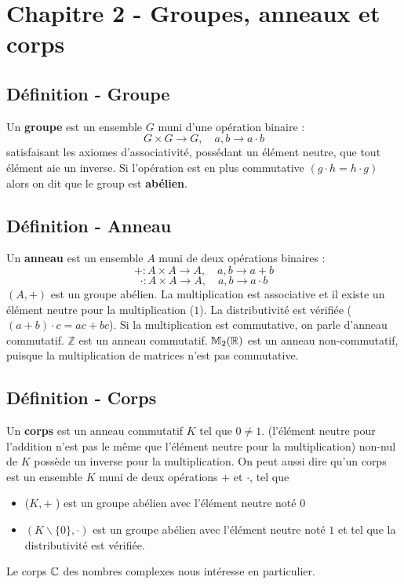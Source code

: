 \documentclass[12pt]{article}
\begin{document}
\section{Chapitre 2 - Groupes, anneaux et corps}
\subsection{Définition - Groupe}
Un \textbf{groupe} est un ensemble $G$ muni d'une opération binaire :
$$
G \times G \rightarrow G, \quad a,b \rightarrow a \cdot b
$$
satisfaisant les axiomes d'associativité, possédant un élément neutre, que tout élément aie un inverse. 
Si l'opération est en plus commutative $(g \cdot h = h \cdot g)$ alors on dit que le group est \textbf{abélien}.
\pagebreak
\subsection{Définition - Anneau}
Un \textbf{anneau} est un ensemble $A$ muni de deux opérations binaires :
$$
+ : A \times A \rightarrow A, \quad a,b \rightarrow a + b
$$
$$\cdot : A \times A \rightarrow A, \quad a,b \rightarrow a\cdot b$$
$(A, +)$ est un groupe abélien. 
La multiplication est associative et il existe un élément neutre pour la multiplication ($1$). 
La distributivité est vérifiée ($(a+b)\cdot c = ac + bc$).
Si la multiplication est commutative, on parle d'anneau commutatif. $\mathbb Z$ est un anneau commutatif. $\mathbb M_2(\mathbb{R})$ est un anneau non-commutatif, puisque la multiplication de matrices n'est pas commutative.

\subsection{Définition - Corps}
Un \textbf{corps} est un anneau commutatif $K$ tel que $0 \neq 1$. (l'élément neutre pour l'addition n'est pas le même que l'élément neutre pour la multiplication) non-nul de $K$ possède un inverse pour la multiplication.
On peut aussi dire qu'un corps est un ensemble $K$ muni de deux opérations $+$ et $\cdot$, tel que
\begin{itemize}
    \item ($K, +$ ) est un groupe abélien avec l'élément neutre noté $0$
    \item $(K \backslash \{0\}, \cdot)$ est un groupe abélien avec l'élément neutre  noté $1$ et tel que la distributivité est vérifiée.
\end{itemize}
Le corps $\mathbb{C}$ des nombres complexes nous intéresse en particulier.
\end{document}
